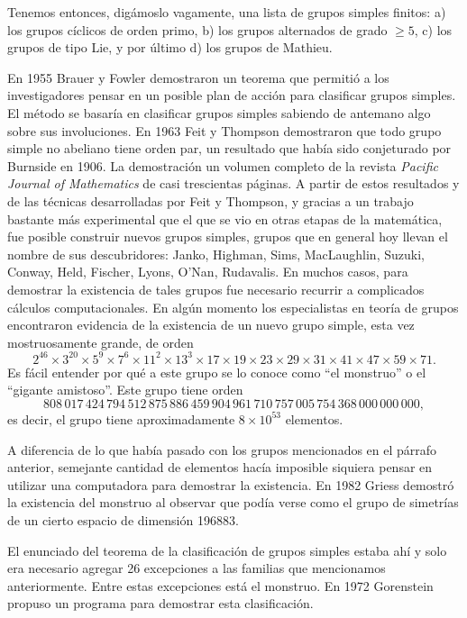 Tenemos entonces,
digámoslo vagamente, una lista de grupos simples finitos: a) los grupos
cíclicos de orden primo, b) los grupos alternados de grado $\geq 5$, c) los
grupos de tipo Lie, y por último d) los grupos de Mathieu. 

En 1955 Brauer y Fowler demostraron un teorema que permitió a los investigadores
pensar en un posible plan de acción para clasificar grupos simples. El método 
se basaría en clasificar grupos simples sabiendo de antemano algo sobre sus 
involuciones.  
En 1963 Feit y Thompson demostraron que todo grupo simple no abeliano tiene orden par, 
un resultado que había sido conjeturado por Burnside en 1906. La demostración un
volumen completo de la revista \emph{Pacific Journal of Mathematics} de casi
trescientas páginas. A partir de estos resultados y de las técnicas desarrolladas
por Feit y Thompson, y gracias a un trabajo bastante más experimental 
que el que se vio en otras etapas de la matemática, 
fue posible construir nuevos grupos simples, grupos que en
general hoy llevan el nombre de sus descubridores: Janko, Highman, Sims,
MacLaughlin, Suzuki, Conway, Held, Fischer, Lyons, O'Nan, Rudavalis. En muchos
casos, para demostrar la existencia de tales grupos fue necesario recurrir a
complicados cálculos computacionales. En algún momento los especialistas en
teoría de grupos encontraron evidencia de la existencia de un nuevo grupo
simple, esta vez mostruosamente grande, de orden 
\[
	2^{46}\times 3^{20}\times 5^9\times 7^6\times 11^2\times 13^3\times 17\times 19\times 23\times 29\times 31\times 41\times 47\times 59\times 71. 
\]
Es fácil entender por qué a este grupo se lo conoce como ``el monstruo'' o el 
``gigante amistoso''. Este grupo tiene orden 
\[
808\,017\,424\,794\,512\,875\,886\,459\,904\,961\,710\,757\,005\,754\,368\,000\,000\,000,
\]
es decir, el grupo tiene aproximadamente $8\times 10^{53}$ elementos.

A diferencia de lo que había pasado con los grupos mencionados en el párrafo
anterior, semejante cantidad de elementos hacía imposible siquiera pensar en
utilizar una computadora para demostrar la existencia. En 1982 Griess demostró
la existencia del monstruo al observar que podía verse como el grupo de
simetrías de un cierto espacio de dimensión 196883. 

El enunciado del teorema de la clasificación de grupos simples estaba ahí y
solo era necesario agregar 26 excepciones a las familias que mencionamos
anteriormente. Entre estas excepciones está el monstruo.  En 1972 Gorenstein
propuso un programa para demostrar esta clasificación. 

